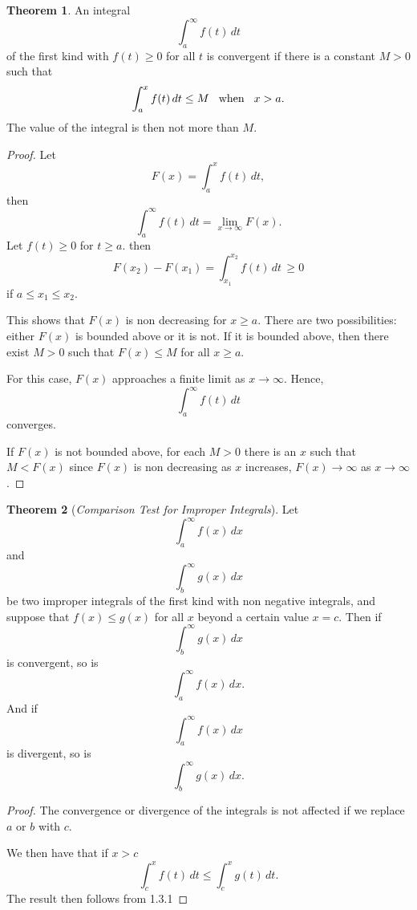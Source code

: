 \documentclass[12pt,a4paper]{report}
\theoremstyle{definition}
\newtheorem{thm}{Theorem}[section]
\theoremstyle{plain}
\begin{document}
\begin{thm}
An integral $$\int_a^{\infty} f(t)\, dt$$ of the first kind with $f(t)\geq 0$ for all $t$ is convergent if there is a constant $M>0$ such that $$\int_a^xf(t)\, dt \leq M\hspace{0.3cm}\text{when}\hspace{0.3cm} x > a.$$
The value of the integral is then not more than $M$.
\end{thm}


\begin{proof}
Let $$F(x) = \int_a^xf(t)\, dt,$$ then $$\int_a^{\infty} f(t)\, dt = \lim_{x\rightarrow \infty} F(x).$$ Let $f(t)\geq 0$ for $t\geq a$. then
$$F(x_2) - F(x_1) = \int_{x_1}^{x_2} f(t)\, dt\, \geq 0$$ if $a \leq x_1 \leq x_2.$


This shows that $F(x)$ is non decreasing for $x\geq a$. There are two possibilities: either $F(x)$ is bounded above or it is not. If it is bounded above, then there exist $M > 0$ such that  $F(x) \leq M$ for all $x\geq a$.

For this  case, $F(x)$ approaches a finite limit as $x \rightarrow \infty$. Hence, $$\int_a^{\infty} f(t)\, dt$$ converges.



If $F(x)$ is not bounded above, for each $M>0$ there is an $x$ such that $M<F(x)$  since $F(x)$ is non decreasing as $x$ increases, $F(x) \rightarrow \infty$ as $x \rightarrow \infty$.  
\end{proof}




\begin{thm}[\textit{Comparison Test for Improper Integrals}]
Let $$\int_a^{\infty} f(x)\, dx$$ and $$\int_b^{\infty} g(x)\, dx$$ be two improper integrals of the first kind with non negative integrals, and suppose that $f(x) \leq g(x)$ for all $x$ beyond a certain value $x = c$. Then if $$\int_b^{\infty} g(x)\, dx$$ is convergent, so is $$\int_a^{\infty} f(x)\, dx.$$ And if $$\int_a^{\infty} f(x)\, dx$$ is divergent, so is $$\int_b^{\infty} g(x)\, dx.$$
\end{thm}

\begin{proof}
The convergence or divergence of the integrals is not affected if we replace $a$ or $b$ with $c$.

We then have that if $x>c$ $$\int_c^xf(t)\, dt \leq \int_c^xg(t) \, dt.$$  The result then follows from 1.3.1
\end{proof}
\end{document}
